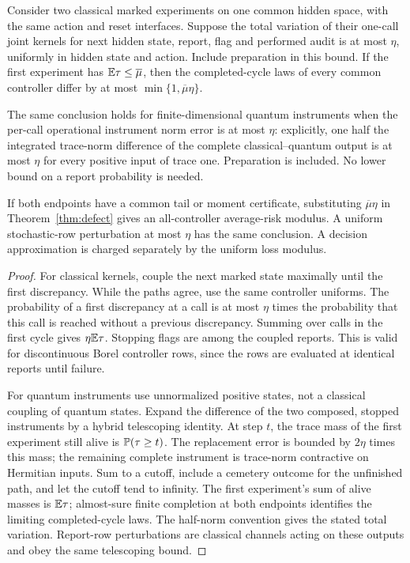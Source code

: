 \begin{lemma}\label{lem:primitive}
Consider two classical marked experiments on one common hidden space, with the same action and reset interfaces. Suppose the total variation of their one-call joint kernels for next hidden state, report, flag and performed audit is at most $\eta$, uniformly in hidden state and action. Include preparation in this bound. If the first experiment has $\mathbb E\tau\le\overline\mu$, then the completed-cycle laws of every common controller differ by at most $\min\{1,\overline\mu\eta\}$.

The same conclusion holds for finite-dimensional quantum instruments when the per-call operational instrument norm error is at most $\eta$: explicitly, one half the integrated trace-norm difference of the complete classical--quantum output is at most $\eta$ for every positive input of trace one. Preparation is included. No lower bound on a report probability is needed.

If both endpoints have a common tail or moment certificate, substituting $\overline\mu\eta$ in Theorem~\ref{thm:defect} gives an all-controller average-risk modulus. A uniform stochastic-row perturbation at most $\eta$ has the same conclusion. A decision approximation is charged separately by the uniform loss modulus.
\end{lemma}
\begin{proof}
For classical kernels, couple the next marked state maximally until the first discrepancy. While the paths agree, use the same controller uniforms. The probability of a first discrepancy at a call is at most $\eta$ times the probability that this call is reached without a previous discrepancy. Summing over calls in the first cycle gives $\eta\mathbb E\tau$. Stopping flags are among the coupled reports. This is valid for discontinuous Borel controller rows, since the rows are evaluated at identical reports until failure.

For quantum instruments use unnormalized positive states, not a classical coupling of quantum states. Expand the difference of the two composed, stopped instruments by a hybrid telescoping identity. At step $t$, the trace mass of the first experiment still alive is $\mathbb P(\tau\ge t)$. The replacement error is bounded by $2\eta$ times this mass; the remaining complete instrument is trace-norm contractive on Hermitian inputs. Sum to a cutoff, include a cemetery outcome for the unfinished path, and let the cutoff tend to infinity. The first experiment's sum of alive masses is $\mathbb E\tau$; almost-sure finite completion at both endpoints identifies the limiting completed-cycle laws. The half-norm convention gives the stated total variation. Report-row perturbations are classical channels acting on these outputs and obey the same telescoping bound.
\end{proof}

